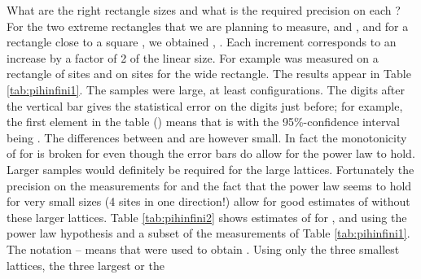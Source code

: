 \documentclass[a4paper,12pt]{article}
\begin{document}
What are the right rectangle sizes and what is the required precision on
each \coordHE{}? For the two extreme rectangles that we are planning
to measure, \coordHE{} and
\coordHE{}, and for a rectangle
close to a square \coordHE{},
we obtained \coordHE{}, \coordHE{}. Each increment corresponds to an
increase by a factor of 2 of the linear size. For example \coordHE{} 
was measured on a rectangle of \coordHE{} sites and \coordHE{} on
\coordHE{} sites for the wide rectangle. The results appear in Table
\ref{tab:pihinfini1}. The samples were large, at least \coordHE{}
configurations. The digits
after the vertical bar gives the statistical error on the digits just
before; for example, 
the first element in the table (\coordHE{}) means
that \coordHE{} is \coordHE{} with the
95\%-confidence interval being \myHighlight{$[0.029248, 0.029290]$}\coordHE{}. The differences between
\coordHE{} and \coordHE{} are however small. 
In fact the monotonicity of \coordHE{} for \coordHE{} is broken for \coordHE{} even though the error bars do allow for
the power law to hold.
Larger samples would definitely be required
for the large lattices. Fortunately the precision on the measurements
for \coordHE{} and the fact that the power law seems to hold for very small
sizes (4 sites in one direction!) allow for good estimates of \coordHE{} 
without these larger lattices. Table \ref{tab:pihinfini2} shows estimates
of \coordHE{} for \coordHE{}, \coordHE{} and \coordHE{}
using the power law hypothesis and a subset of the measurements of
Table \ref{tab:pihinfini1}. The notation \coordHE{}--\coordHE{} means that 
\coordHE{} were used to obtain 
\coordHE{}. Using only the three smallest lattices, the three largest or the
\end{document}
